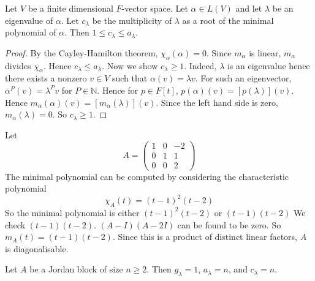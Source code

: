 \begin{lemma}
	Let \( V \) be a finite dimensional \( F \)-vector space.
	Let \( \alpha \in L(V) \) and let \( \lambda \) be an eigenvalue of \( \alpha \).
	Let \( c_\lambda \) be the multiplicity of \( \lambda \) as a root of the minimal polynomial of \( \alpha \).
	Then \( 1 \leq c_\lambda \leq a_\lambda \).
\end{lemma}
\begin{proof}
	By the Cayley-Hamilton theorem, \( \chi_\alpha(\alpha) = 0 \).
	Since \( m_\alpha \) is linear, \( m_\alpha \) divides \( \chi_\alpha \).
	Hence \( c_\lambda \leq a_\lambda \).
	Now we show \( c_\lambda \geq 1 \).
	Indeed, \( \lambda \) is an eigenvalue hence there exists a nonzero \( v \in V \) such that \( \alpha(v) = \lambda v \).
	For such an eigenvector, \( \alpha^P(v) = \lambda^P v \) for \( P \in \mathbb N \).
	Hence for \( p \in F[t] \), \( p(\alpha)(v) = [p(\lambda)](v) \).
	Hence \( m_\alpha(\alpha)(v) = [m_\alpha(\lambda)](v) \).
	Since the left hand side is zero, \( m_\alpha(\lambda) = 0 \).
	So \( c_\lambda \geq 1 \).
\end{proof}
\begin{example}
	Let
	\[
		A = \begin{pmatrix}
			1 & 0 & -2 \\
			0 & 1 & 1  \\
			0 & 0 & 2
		\end{pmatrix}
	\]
	The minimal polynomial can be computed by considering the characteristic polynomial
	\[
		\chi_A(t) = (t-1)^2(t-2)
	\]
	So the minimal polynomial is either \( (t-1)^2(t-2) \) or \( (t-1)(t-2) \)
	We check \( (t-1)(t-2) \).
	\( (A - I)(A - 2I) \) can be found to be zero.
	So \( m_A(t) = (t-1)(t-2) \).
	Since this is a product of distinct linear factors, \( A \) is diagonalisable.
\end{example}
\begin{example}
	Let \( A \) be a Jordan block of size \( n \geq 2 \).
	Then \( g_\lambda = 1 \), \( a_\lambda = n \), and \( c_\lambda = n \).
\end{example}

